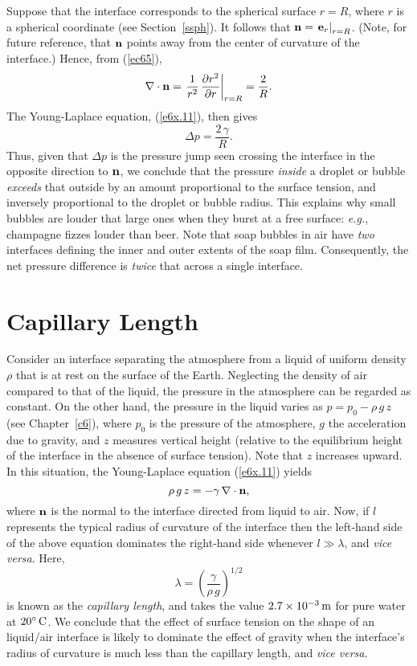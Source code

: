 Suppose that the interface corresponds to the spherical surface $r=R$, where $r$ is a spherical coordinate (see Section~\ref{ssph}).
It follows that ${\bf n}= \left.{\bf e}_r\right|_{r=R}$. (Note, for future reference, that ${\bf n}$ points away from the center of
curvature of the interface.)
 Hence, from (\ref{ec65}), 
\begin{equation}\label{e6x12}
\nabla\cdot{\bf n} = \left.\frac{1}{r^2}\,\frac{\partial r^2}{\partial r}\right|_{r=R} = \frac{2}{R}.
\end{equation}
The Young-Laplace equation, (\ref{e6x.11}), then gives
\begin{equation}
\Delta p = \frac{2\,\gamma}{R}.
\end{equation}
Thus, given that $\Delta p$ is the pressure jump seen crossing the interface in the opposite direction to ${\bf n}$, 
we conclude that the
pressure {\em inside}\/ a droplet or bubble {\em exceeds}\/ that outside by an amount proportional to the surface tension, and
inversely proportional to the droplet or bubble radius. This explains why small bubbles are louder that large
ones when they burst at a free surface: {\em e.g.}, champagne fizzes louder than beer. Note that soap bubbles in air
have {\em two}\/ interfaces  defining  the inner and outer extents of the soap film. Consequently, the net pressure difference is
{\em twice}\/ that across a single interface.  

\section{Capillary Length}\label{sclen}
Consider an interface separating the atmosphere from a liquid of uniform density $\rho$ that is at rest on the surface of the
Earth. Neglecting the density of air compared to that of the liquid, the pressure in the atmosphere can
be regarded as constant. On the other hand, the pressure in the liquid varies as $p=p_0-\rho\,g\,z$ (see Chapter~\ref{c6}), where
$p_0$ is the pressure of the atmosphere, $g$  the acceleration due to gravity, and $z$ measures vertical height (relative
to the equilibrium height of the interface in the absence of surface tension). Note that $z$
increases upward. In this situation, the Young-Laplace equation (\ref{e6x.11})
yields
\begin{equation}\label{e6x.14}
\rho\,g\,z = -\gamma\,\nabla\cdot{\bf n},
\end{equation}
where ${\bf n}$ is the normal to the interface directed from liquid to air.  Now, if $l$ represents the typical radius of curvature of the
interface then the left-hand side of the above equation dominates the right-hand side whenever $l\gg \lambda$,
and {\em vice versa}. Here, 
\begin{equation}\label{e6x16}
\lambda = \left(\frac{\gamma}{\rho\,g}\right)^{1/2}
\end{equation}
is known as the {\em capillary length}, and takes the value $2.7\times 10^{-3}\,{\rm m}$
for pure water at $20^\circ\,{\rm C}$. We conclude that the effect of surface tension on the shape of an liquid/air interface
is likely to dominate the effect of gravity when the  interface's radius of curvature is much less than the capillary length, and {\em vice versa}. 

